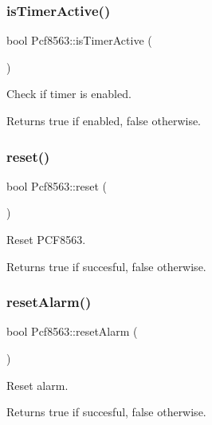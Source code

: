 \subsubsection{\texorpdfstring{is\+Timer\+Active()}{isTimerActive()}}
{\footnotesize\ttfamily bool Pcf8563\+::is\+Timer\+Active (\begin{DoxyParamCaption}{ }\end{DoxyParamCaption})}



Check if timer is enabled. 

\begin{DoxyReturn}{Returns}
true if enabled, false otherwise. 
\end{DoxyReturn}
\mbox{\label{namespacePcf8563_abe54082b4f23e40ef4f5be845b5cf008}} 
\subsubsection{\texorpdfstring{reset()}{reset()}}
{\footnotesize\ttfamily bool Pcf8563\+::reset (\begin{DoxyParamCaption}{ }\end{DoxyParamCaption})}



Reset P\+C\+F8563. 

\begin{DoxyReturn}{Returns}
true if succesful, false otherwise. 
\end{DoxyReturn}
\mbox{\label{namespacePcf8563_ae554435cc17a3e49d9d731b97e3fc0be}} 
\subsubsection{\texorpdfstring{reset\+Alarm()}{resetAlarm()}}
{\footnotesize\ttfamily bool Pcf8563\+::reset\+Alarm (\begin{DoxyParamCaption}{ }\end{DoxyParamCaption})}



Reset alarm. 

\begin{DoxyReturn}{Returns}
true if succesful, false otherwise. 
\end{DoxyReturn}
\mbox{\label{namespacePcf8563_a6fd0509d12fd312b5dbed8506b9315c9}} 
